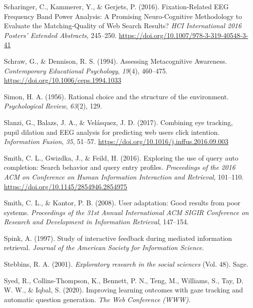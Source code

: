\documentclass[letterpaper, nobind]{templates/ociamthesis}
\newlength{\cslhangindent}
\newenvironment{CSLReferences}[2] %
 {%
  \setlength{\parindent}{0pt}
  \ifodd #1
  \let\oldpar\par
  \def\par{\hangindent=\cslhangindent\oldpar}
  \fi
  \setlength{\parskip}{1mm}
  \setlength{\baselineskip}{6mm}
 }%
 {}
\begin{document}
\begin{CSLReferences}{1}{0}
\leavevmode{}%
Scharinger, C., Kammerer, Y., \& Gerjets, P. (2016). Fixation-{Related EEG Frequency Band Power Analysis}: {A Promising Neuro}-{Cognitive Methodology} to {Evaluate} the {Matching}-{Quality} of {Web Search Results}? \emph{{HCI International} 2016 \textendash{} {Posters}' {Extended Abstracts}}, 245--250. \url{https://doi.org/10.1007/978-3-319-40548-3-41}

\leavevmode{}%
Schraw, G., \& Dennison, R. S. (1994). Assessing {Metacognitive Awareness}. \emph{Contemporary Educational Psychology}, \emph{19}(4), 460--475. \url{https://doi.org/10.1006/ceps.1994.1033}

\leavevmode{}%
Simon, H. A. (1956). Rational choice and the structure of the environment. \emph{Psychological Review}, \emph{63}(2), 129.

\leavevmode{}%
Slanzi, G., Balazs, J. A., \& Velásquez, J. D. (2017). Combining eye tracking, pupil dilation and {EEG} analysis for predicting web users click intention. \emph{Information Fusion}, \emph{35}, 51--57. \url{https://doi.org/10.1016/j.inffus.2016.09.003}

\leavevmode{}%
Smith, C. L., Gwizdka, J., \& Feild, H. (2016). Exploring the use of query auto completion: {Search} behavior and query entry profiles. \emph{Proceedings of the 2016 {ACM} on Conference on Human Information Interaction and Retrieval}, 101--110. \url{https://doi.org/10.1145/2854946.2854975}

\leavevmode{}%
Smith, C. L., \& Kantor, P. B. (2008). User adaptation: Good results from poor systems. \emph{Proceedings of the 31st Annual International ACM SIGIR Conference on Research and Development in Information Retrieval}, 147--154.

\leavevmode{}%
Spink, A. (1997). Study of interactive feedback during mediated information retrieval. \emph{Journal of the American Society for Information Science}.

\leavevmode{}%
Stebbins, R. A. (2001). \emph{Exploratory research in the social sciences} (Vol. 48). Sage.

\leavevmode{}%
Syed, R., Collins-Thompson, K., Bennett, P. N., Teng, M., Williams, S., Tay, D. W. W., \& Iqbal, S. (2020). Improving learning outcomes with gaze tracking and automatic question generation. \emph{The Web Conference (WWW)}.


\end{CSLReferences}
\end{document}
